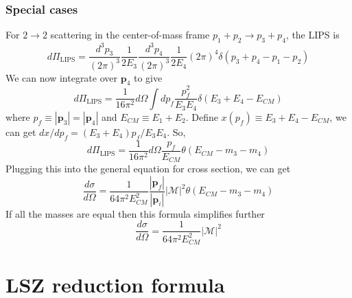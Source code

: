 \subsubsection{Special cases}
\noindent
For $2 \to 2$ scattering in the center-of-mass frame
$p_1 + p_2 \to p_3 + p_4$,
the LIPS is
\[d\Pi_{\mathrm{LIPS}} = \frac{d^3p_3}{(2\pi)^3} \frac{1}{2E_3 } \frac{d^3p_4}{(2\pi)^3} \frac{1}{2E_4} (2\pi)^4 \delta(p_3+p_4-p_1-p_2)\]
We can now integrate over $\bm{p}_4$ to give
\[d\Pi_{\mathrm{LIPS}} = \frac{1}{16\pi^2} d\Omega \int dp_f \frac{p_f^2}{E_3 E_4} \delta(E_3+E_4 -E_{CM})\]
where $p_f \equiv |\bm{p}_3| = |\bm{p}_4|$ and $E_{CM} \equiv E_1 + E_2$.
Define $x(p_f) \equiv E_3 + E_4 - E_{CM}$, we can get
$dx/dp_f = (E_3+E_4)p_f/E_3E_4$.
So,
\[d\Pi_{\mathrm{LIPS}} = \frac{1}{16\pi^2} d\Omega \frac{p_f}{E_{CM}}\theta (E_{CM} - m_3 -m_4)\]
Plugging this into the general equation for cross section, we can get
\[ \frac{d\sigma}{d\Omega} = \frac{1}{64\pi^2 E_{CM}^2} \frac{|\bm{p}_f|}{|\bm{p}_i|} |\mathcal{M}|^2 \theta (E_{CM} - m_3 -m_4) \]
If all the masses are equal then this formula simplifies further
\[\frac{d\sigma}{d\Omega} = \frac{1}{64\pi^2 E_{CM}^2} |\mathcal{M}|^2\]
\newpage

\section{LSZ reduction formula}
